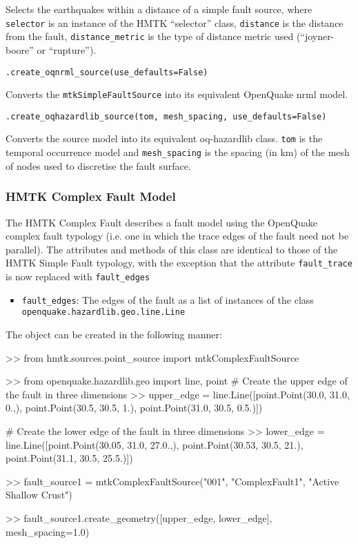 Selects the earthquakes within a distance of a simple fault source, where \verb=selector= is an instance of the HMTK ``selector'' class, \verb=distance= is the distance from the fault, \verb=distance_metric= is the type of distance metric used (``joyner-boore'' or ``rupture''). 

\verb;.create_oqnrml_source(use_defaults=False);

Converts the \verb=mtkSimpleFaultSource= into its equivalent OpenQuake nrml model.

\verb;.create_oqhazardlib_source(tom, mesh_spacing, use_defaults=False);

Converts the source model into its equivalent oq-hazardlib class. \verb=tom= is the temporal occurrence model and \verb=mesh_spacing= is the spacing (in km) of the mesh of nodes used to discretise the fault surface.

\subsubsection{HMTK Complex Fault Model}

The HMTK Complex Fault describes a fault model using the OpenQuake complex fault typology (i.e. one in which the trace edges of the fault need not be parallel). The attributes and methods of this class are identical to those of the HMTK Simple Fault typology, with the exception that the attribute \verb=fault_trace= is now replaced with \verb=fault_edges=

\begin{itemize}
\item \verb=fault_edges=: The edges of the fault as a list of instances of the class \\ \verb=openquake.hazardlib.geo.line.Line=
\end{itemize}

The object can be created in the following manner:

\begin{python}[frame=single]
>> from hmtk.sources.point_source import mtkComplexFaultSource

>> from openquake.hazardlib.geo import line, point
# Create the upper edge of the fault in three dimensions
>> upper_edge = line.Line([point.Point(30.0, 31.0, 0.,),
                           point.Point(30.5, 30.5, 1.),
                           point.Point(31.0, 30.5, 0.5.)]) 
                                 
# Create the lower edge of the fault in three dimensions
>> lower_edge = line.Line([point.Point(30.05, 31.0, 27.0.,),
                           point.Point(30.53, 30.5, 21.),
                           point.Point(31.1, 30.5, 25.5.)]) 

>> fault_source1 = mtkComplexFaultSource("001",
                                         "ComplexFault1",
                                         "Active Shallow Crust")

>> fault_source1.create_geometry([upper_edge,
                                  lower_edge],
                                  mesh_spacing=1.0)
\end{python}

